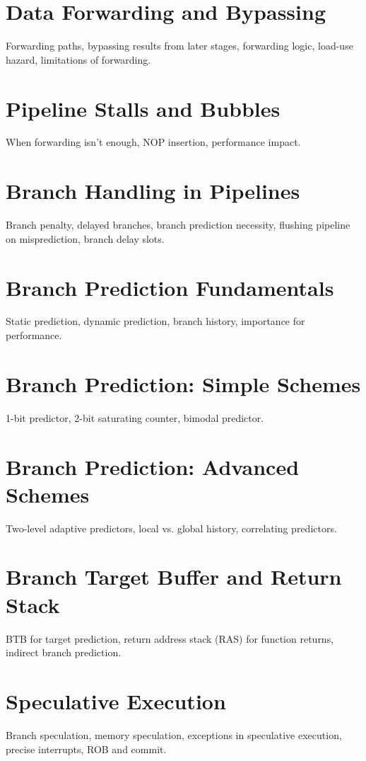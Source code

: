 \chapter{Data Forwarding and Bypassing}
Forwarding paths, bypassing results from later stages, forwarding logic, load-use hazard, limitations of forwarding.

\chapter{Pipeline Stalls and Bubbles}
When forwarding isn't enough, NOP insertion, performance impact.

\chapter{Branch Handling in Pipelines}
Branch penalty, delayed branches, branch prediction necessity, flushing pipeline on misprediction, branch delay slots.

\chapter{Branch Prediction Fundamentals}
Static prediction, dynamic prediction, branch history, importance for performance.

\chapter{Branch Prediction: Simple Schemes}
1-bit predictor, 2-bit saturating counter, bimodal predictor.

\chapter{Branch Prediction: Advanced Schemes}
Two-level adaptive predictors, local vs. global history, correlating predictors.

\chapter{Branch Target Buffer and Return Stack}
BTB for target prediction, return address stack (RAS) for function returns, indirect branch prediction.

\chapter{Speculative Execution}
Branch speculation, memory speculation, exceptions in speculative execution, precise interrupts, ROB and commit.

